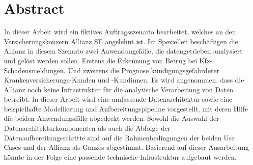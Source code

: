 \chapter*{Abstract}

In dieser Arbeit wird ein fiktives Auftragsszenario
bearbeitet, welches an den Versicherungskonzern Allianz SE angelehnt ist.
Im Speziellen beschäftigen die Allianz in diesem Szenario
zwei Anwendungsfälle, die datengetrieben analysiert und gelöst
werden sollen.
Erstens die Erkennung von Betrug bei Kfz-Schadensmeldungen.
Und zweitens die Prognose kündigungsgefährdeter 
Krankenversicherungs-Kunden und -Kundinnen.
Es wird angenommen, dass die Allianz noch keine
Infrastruktur für die analytische Verarbeitung von Daten betreibt.
In dieser Arbeit wird eine umfassende Datenarchitektur sowie 
eine beispielhafte Modellierung und Aufbereitungspipeline vorgestellt,
mit deren Hilfe die beiden Anwendungsfälle abgedeckt werden.
Sowohl die Auswahl der Datenarchitekturkomponenten als auch 
die Abfolge der Datenaufbereitungsschritte sind auf 
die Rahmenbedingungen der beiden Use Cases und der Allianz als Ganzes abgestimmt.
Basierend auf dieser Ausarbeitung könnte in der Folge
eine passende technische Infrastruktur aufgebaut werden.
